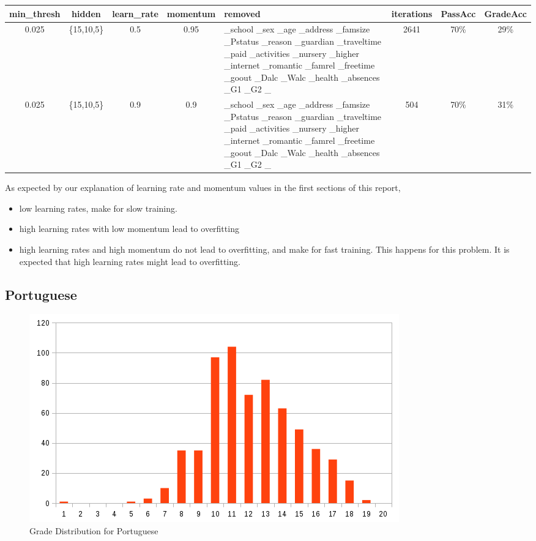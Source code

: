 \documentclass[11pt]{article}
\begin{document}
\newpage
\begin{tabular}{| c | c | c | c | p{3cm} | c | c | c |}
\hline \textbf{min\_thresh} & \textbf{hidden} & \textbf{learn\_rate} & \textbf{momentum} & \textbf{removed} & \textbf{iterations} & \textbf{PassAcc} & \textbf{GradeAcc}\\
\hline 0.025 & \{15,10,5\} & 0.5 & 0.95 & \_school \_sex \_age \_address \_famsize \_Pstatus \_reason \_guardian \_traveltime \_paid \_activities \_nursery \_higher \_internet \_romantic \_famrel \_freetime \_goout \_Dalc \_Walc \_health \_absences \_G1 \_G2 \_ & 2641 & 70\% & 29\%\\
\hline 0.025 & \{15,10,5\} & 0.9 & 0.9 & \_school \_sex \_age \_address \_famsize \_Pstatus \_reason \_guardian \_traveltime \_paid \_activities \_nursery \_higher \_internet \_romantic \_famrel \_freetime \_goout \_Dalc \_Walc \_health \_absences \_G1 \_G2 \_ & 504 & 70\% & 31\%\\
\hline
\end{tabular}

As expected by our explanation of learning rate and momentum values in the first sections of this report, 
\begin{itemize}
\item low learning rates, make for slow training.
\item high learning rates with low momentum lead to overfitting
\item high learning rates and high momentum do not lead to overfitting, and make for fast training. This happens for this problem. It is expected that high learning rates might lead to overfitting.
\end{itemize}

\hfill \break
\hfill \break
\subsection{Portuguese}
\begin{figure}[H]
\label{fig:Grade Distribution for Portuguese}
\includegraphics[scale=0.6]{por-chart.png}
\centering
\caption{Grade Distribution for Portuguese}
\end{figure}
\end{document}
